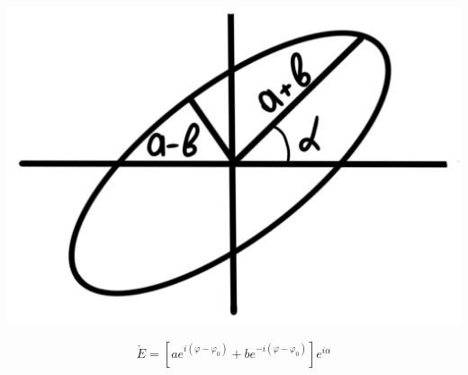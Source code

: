 \begin{minipage}[c]{0.2\textwidth} %
    \includegraphics[width=\textwidth]{im/104.png}%
\end{minipage}%
\hfill
\begin{minipage}[c]{0.6\textwidth} %
\[
\check{E}=\left[ae^{i(\varphi-\varphi_0)}+be^{-i(\varphi-\varphi_0)}\right]e^{i\alpha}
\]
\end{minipage}